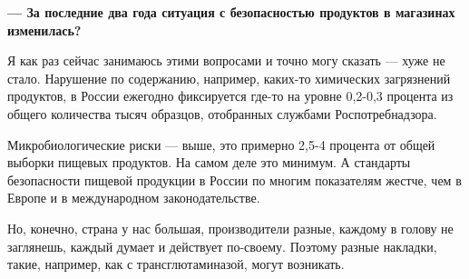 \textbf{--- За последние два года ситуация с безопасностью продуктов в магазинах изменилась? }

Я как раз сейчас занимаюсь этими вопросами и точно могу сказать
--- хуже не стало.
Нарушение по содержанию, например, каких-то химических загрязнений
продуктов, в России ежегодно фиксируется где-то на уровне 0,2-0,3
процента из общего количества тысяч образцов, отобранных службами Роспотребнадзора.

Микробиологические риски --- выше, это примерно 2,5-4 процента от общей
выборки пищевых продуктов. На самом деле это минимум.
А стандарты безопасности пищевой продукции в России по многим
показателям жестче, чем в Европе и в международном законодательстве.

Но, конечно, страна у нас большая, производители разные, каждому в голову
не заглянешь, каждый думает и действует по-своему.
Поэтому разные накладки, такие, например, как с трансглютаминазой, могут возникать.
